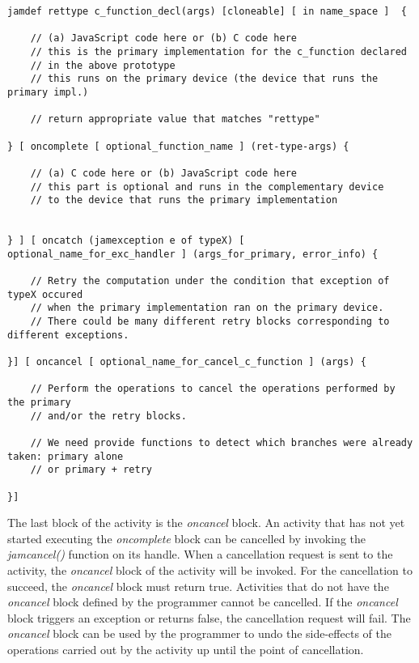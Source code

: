 \documentclass[11pt]{article}
\begin{document}
\begin{lstlisting}[caption=Syntax of the activity definition construct, label=activity_def]
jamdef rettype c_function_decl(args) [cloneable] [ in name_space ]  {

    // (a) JavaScript code here or (b) C code here
    // this is the primary implementation for the c_function declared
    // in the above prototype
    // this runs on the primary device (the device that runs the primary impl.)

    // return appropriate value that matches "rettype"

} [ oncomplete [ optional_function_name ] (ret-type-args) {

    // (a) C code here or (b) JavaScript code here
    // this part is optional and runs in the complementary device
    // to the device that runs the primary implementation


} ] [ oncatch (jamexception e of typeX) [ optional_name_for_exc_handler ] (args_for_primary, error_info) {

    // Retry the computation under the condition that exception of typeX occured
    // when the primary implementation ran on the primary device.
    // There could be many different retry blocks corresponding to different exceptions.

}] [ oncancel [ optional_name_for_cancel_c_function ] (args) {

    // Perform the operations to cancel the operations performed by the primary
    // and/or the retry blocks.

    // We need provide functions to detect which branches were already taken: primary alone
    // or primary + retry

}]
\end{lstlisting}

The last block of the activity is the {\em oncancel} block. An activity that has
not yet started executing the {\em oncomplete} block can be cancelled by
invoking the {\em jamcancel()} function on its handle. When a cancellation
request is sent to the activity, the {\em oncancel} block of the activity will
be invoked. For the cancellation to succeed, the {\em oncancel} block must
return true. Activities that do not have the {\em oncancel} block defined by the
programmer cannot be cancelled. If the {\em oncancel} block triggers an
exception or returns false, the cancellation request will fail. The {\em
oncancel} block can be used by the programmer to undo the side-effects of the
operations carried out by the activity up until the point of cancellation.
\end{document}

